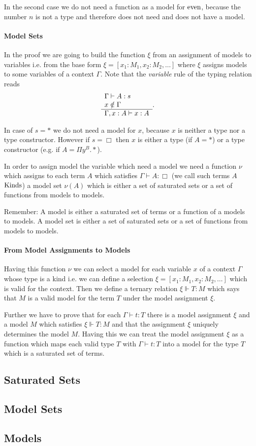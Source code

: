 In the second case we do not need a function as a model for $\text{even}$, because
the number $n$ is not a type and therefore does not need and does not have a
model.


\paragraph{Model Sets}
In the proof we are going to build the function $\xi$ from an assignment of
models to variables i.e. from the base form $\xi = [x_1:M_1, x_2:M_2,\ldots]$
where $\xi$ assigns models to some variables of a context $\Gamma$. Note that
the \emph{variable} rule of the typing relation reads
$$
\begin{array}{l} \Gamma \vdash A:s
\\ x \notin \Gamma \\ \hline \Gamma,x:A \vdash x :A\end{array}.
$$

In case of $s = *$ we do not need a model for $x$, because $x$ is neither a
type nor a type constructor. However if $s = \Box$ then $x$ is either a type
(if $A = *$) or a type constructor (e.g. if $A = \Pi y^B.*$).

In order to assign model the variable which need a model we need a function
$\nu$ which assigns to each term $A$ which satisfies $\Gamma \vdash A:\Box$
(we call such terms $A$ $\text{Kinds}$) a model set $\nu(A)$ which is either a set
of saturated sets or a set of functions from models to models.

Remember: A model is either a saturated set of terms or a function of a models
to models. A model set is either a set of saturated sets or a set of functions
from models to models.

\paragraph{From Model Assignments to Models}
Having this function $\nu$ we can select a model for each variable $x$ of a
context $\Gamma$ whose type is a kind i.e. we can define a selection
$\xi = [x_1:M_1, x_2:M_2,\ldots]$ which is valid for the context. Then we
define a ternary relation $\xi \Vdash T : M$ which says that $M$ is a valid
model for the term $T$ under the model assignment $\xi$.

Further we have to prove that for each $\Gamma \vdash t:T$ there is a model
assignment $\xi$ and a model $M$ which satisfies $\xi \Vdash T:M$ and that the
assignment $\xi$ uniquely determines the model $M$. Having this we can treat
the model assignment $\xi$ as a function which maps each valid type $T$ with
$\Gamma \vdash t:T$ into a model for the type $T$ which is a saturated set of
terms.




\subsection{Saturated Sets}


\subsection{Model Sets}



\subsection{Models}
